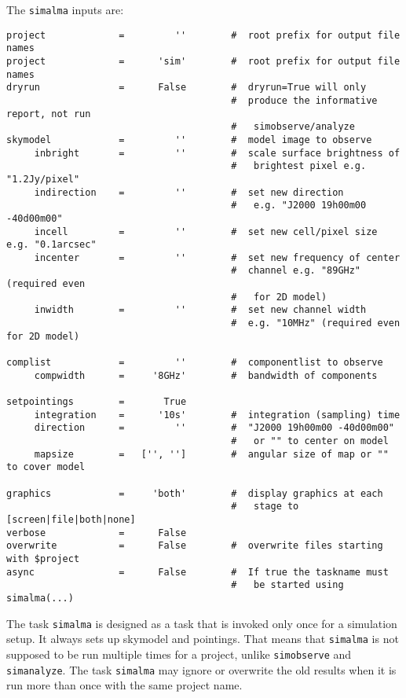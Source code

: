 The {\tt simalma} inputs are:
\small
\begin{verbatim}
project             =         ''        #  root prefix for output file names
project             =      'sim'        #  root prefix for output file names
dryrun              =      False        #  dryrun=True will only
                                        #  produce the informative report, not run
                                        #   simobserve/analyze
skymodel            =         ''        #  model image to observe
     inbright       =         ''        #  scale surface brightness of
                                        #   brightest pixel e.g. "1.2Jy/pixel"
     indirection    =         ''        #  set new direction
                                        #   e.g. "J2000 19h00m00 -40d00m00"
     incell         =         ''        #  set new cell/pixel size e.g. "0.1arcsec"
     incenter       =         ''        #  set new frequency of center
                                        #  channel e.g. "89GHz" (required even
                                        #   for 2D model)
     inwidth        =         ''        #  set new channel width
                                        #  e.g. "10MHz" (required even for 2D model)

complist            =         ''        #  componentlist to observe
     compwidth      =     '8GHz'        #  bandwidth of components

setpointings        =       True        
     integration    =      '10s'        #  integration (sampling) time
     direction      =         ''        #  "J2000 19h00m00 -40d00m00"
                                        #   or "" to center on model
     mapsize        =   ['', '']        #  angular size of map or "" to cover model

graphics            =     'both'        #  display graphics at each
                                        #   stage to [screen|file|both|none]
verbose             =      False        
overwrite           =      False        #  overwrite files starting with $project
async               =      False        #  If true the taskname must
                                        #   be started using simalma(...)
\end{verbatim}
\normalsize

The task {\tt simalma} is designed as a task that is invoked only once for
a simulation setup. It always sets up skymodel and pointings.
That means that {\tt simalma} is not supposed to be run multiple times for a
project, unlike {\tt simobserve} and {\tt simanalyze}. 
The task {\tt simalma} may ignore or overwrite the old results when it is
run more than once with the same project name. 

